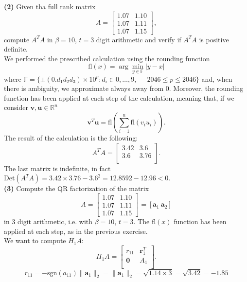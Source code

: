 \documentclass[a4paper,11pt]{article}
\newcommand{\R}{\mathbb{R}}
\begin{document}
\noindent \textbf{(2)} Given tha full rank matrix
\begin{equation}\label{key}
	A = \begin{bmatrix}
		1.07 & 1.10  \\
		1.07 & 1.11  \\
		1.07 & 1.15 
	\end{bmatrix},
\end{equation}
compute $A^T A$ in $\beta = 10$, $t=3$ digit arithmetic and verify if $A^T A$ is positive definite.\\
We performed the prescribed calculation using the rounding function
\begin{equation}\label{key}
	\text{fl}(x) = \arg \min_{y\in \mathbb{F}} |y-x|
\end{equation}
where $\mathbb{F} = \{\pm(0.d_1d_2d_3)\times 10^p : d_i \in {0,\dots,9},\ -2046\le p \le 2046\}$ and, when there is ambiguity, we approximate always away from $0$. Moreover, the rounding function has been applied at each step of the calculation, meaning that, if we consider $\textbf{v}, \textbf{u} \in \R^n$
\begin{equation}\label{key}
	\textbf{v}^T \textbf{u} = \text{fl} \left( \sum_{i=1}^{n}\text{fl} (v_i u_i)\right) .
\end{equation}
The result of the calculation is the following:
\begin{equation}\label{key}
	A^T A =  \begin{bmatrix}
		3.42 & 3.6  \\
		3.6 & 3.76  \\
	\end{bmatrix}.
\end{equation}
The last matrix is indefinite, in fact $\text{Det}(A^T A) = 3.42 \times 3.76 - 3.6^2 = 12.8592 -  12.96 < 0$.\\

\noindent \textbf{(3)} Compute the QR factorization of the matrix
\begin{equation}\label{key}
	A = \begin{bmatrix}
		1.07 & 1.10  \\
		1.07 & 1.11  \\
		1.07 & 1.15 
	\end{bmatrix} = [\textbf{a}_1\ \textbf{a}_2]
\end{equation}
in 3 digit arithmetic, i.e. with $\beta = 10$, $t=3$. The $\text{fl}(x)$ function has been applied at each step, as in the previous exercise.\\
We want to compute $H_1 A$:
\begin{equation}\label{key}
	H_1 A = \begin{bmatrix}
				r_{11} & \textbf{r}_1^T  \\
		\textbf{0} & A_1  \\
	\end{bmatrix}.
\end{equation} 
\begin{equation}\label{key}
	r_{11} = -\text{sgn}(a_{11})\lVert \textbf{a}_1\rVert_2 = \lVert \textbf{a}_1\rVert_2 = \sqrt{1.14 \times 3 }= \sqrt{3.42} = -1.85
\end{equation}
\end{document}
